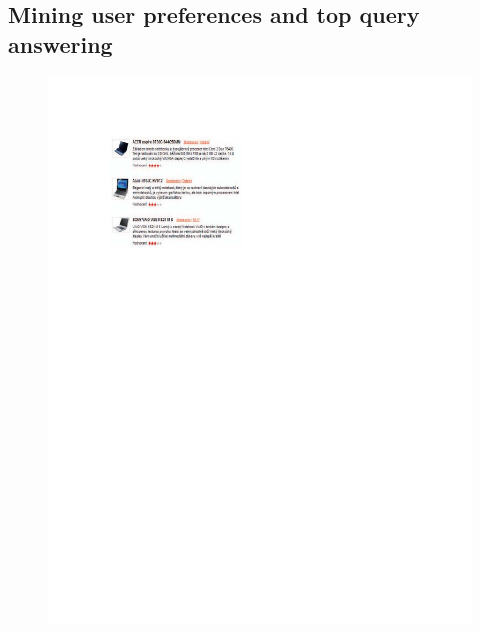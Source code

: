 \subsection{Mining user preferences and top query answering}


\begin{figure}[ht]
\begin{minipage}[b]{0.44\hsize}
	\centering
		\includegraphics[width=\hsize]{img/notebook}
\caption{}
\label{fig:notebook}
\end{minipage}
\hspace{0.5cm}
\begin{minipage}[b]{0.5\hsize}
	\centering

\end{minipage}
\end{figure}
